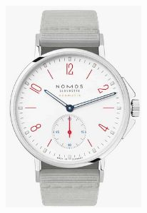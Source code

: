 \begin{multicols}{4}
\begin{figure}[H]
  \centering
  \includegraphics[width=\linewidth]{6x8-temps/nomos.jpeg}
\end{figure}

\end{multicols}

